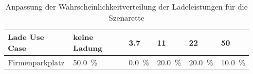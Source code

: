 {
\renewcommand{\arraystretch}{1.2}%
\begin{table}[H]
	\begin{center}
		\caption{Anpassung der Wahrscheinlichkeitverteilung der Ladeleistungen für die Szenarette}
		\begin{tabu} to \textwidth {X[1.7] X[1.3, r] X[1, r] X[1, r] X[1, r] X[1, r]}
			\hline
			Lade Use Case   & keine Ladung        & \SI{3.7}{\kw}      & \SI{11}{\kw}        & \SI{22}{\kw}        & \SI{50}{\kw}        \\ \hline
			Firmenparkplatz & \SI{50.0}{\percent} & \SI{0.0}{\percent} & \SI{20.0}{\percent} & \SI{20.0}{\percent} & \SI{10.0}{\percent} \\ \hline
		\end{tabu}
		\label{tab:UCProbabilitySzenarette}
	\end{center}
	\vspace{-3mm}%
\end{table}
}